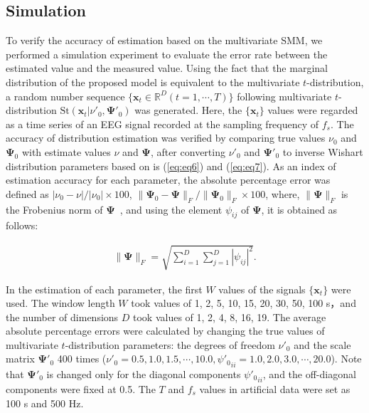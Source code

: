 \documentclass[journal]{IEEEtran}
\begin{document}
\subsection{Simulation}
To verify the accuracy of estimation based on the multivariate SMM, we performed a simulation experiment to evaluate the error rate between the estimated value and the measured value.
Using the fact that the marginal distribution of the proposed model is equivalent to the multivariate $t$-distribution, a random number sequence $\{\mathbf{x}_t \in \mathbb{R}^D (t = 1, \cdots, T)\}$ following multivariate $t$-distribution $\mathrm{St}(\mathbf{x}_t|\nu'_0, \mathbf{\Psi}'_0)$ was generated.
Here, the $\{\mathbf{x}_t \}$ values were regarded as a time series of an EEG signal recorded at the sampling frequency of $f_s$.
The accuracy of distribution estimation was verified by comparing true values $\nu_0$ and $\mathbf{\Psi}_0$ with estimate values $\nu$ and $\mathbf{\Psi}$, after converting $\nu'_0$ and $\mathbf{\Psi}'_0$ to inverse Wishart distribution parameters based on is (\ref{eq:eq6}) and (\ref{eq:eq7}).
As an index of estimation accuracy for each parameter, the absolute percentage error was defined as ${|\nu_0 -\nu|}/{|\nu_0|}\times100$, ${\|\mathbf{\Psi}_0-\mathbf{\Psi}\|_F}/{\|\mathbf{\Psi}_0\|_F}\times100$, where, $\|\mathbf{\Psi}\|_F$ is the Frobenius norm of $\mathbf{\Psi}$~\cite{GeneHowardGolub2013}, and using the element ${\psi_{ij}}$ of $\mathbf{\Psi}$, it is obtained as follows:

\begin{align}%
	\|\mathbf{\Psi}\|_F=\sqrt{\sum_{i=1}^D \sum_{j=1}^D |{\psi_{ij}}|^2}.
\end{align}

In the estimation of each parameter, the first $W$ values of the signals $\{\mathbf{x}_t \}$ were used.
The window length $W$ took values of 1, 2, 5, 10, 15, 20, 30, 50, 100 s，and the number of dimensions $D$ took values of 1, 2, 4, 8, 16, 19.
The average absolute percentage errors were calculated by changing the true values of multivariate $t$-distribution parameters: the degrees of freedom $\nu'_0$ and the scale matrix $\mathbf{\Psi}'_0$ 400 times  ($\nu'_0=0.5,1.0,1.5,\cdots,10.0, {\psi'_0}_{ii} =1.0, 2.0, 3.0,\cdots, 20.0$).
Note that $\mathbf{\Psi}'_0$ is changed only for the diagonal components ${\psi'_0}_{ii}$, and the off-diagonal components were fixed at 0.5. The $T$ and $f_s$ values in artificial data were set as 100 s and 500 Hz.
\end{document}
